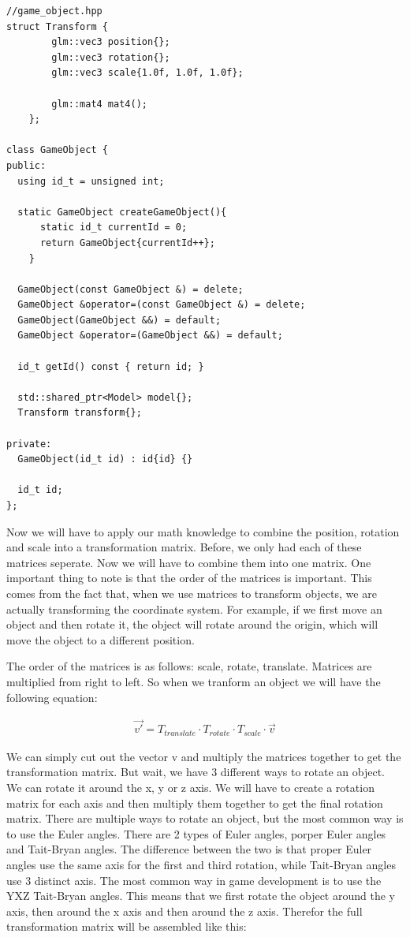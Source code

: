 \documentclass[12pt]{report} \usepackage{preamble}
\begin{document}
\begin{lstlisting}[Language=C++]
//game_object.hpp
struct Transform {
		glm::vec3 position{};
		glm::vec3 rotation{};
		glm::vec3 scale{1.0f, 1.0f, 1.0f};

		glm::mat4 mat4();
	};

class GameObject {
public:
  using id_t = unsigned int;

  static GameObject createGameObject(){
      static id_t currentId = 0;
      return GameObject{currentId++};
    }

  GameObject(const GameObject &) = delete;
  GameObject &operator=(const GameObject &) = delete;
  GameObject(GameObject &&) = default;
  GameObject &operator=(GameObject &&) = default;

  id_t getId() const { return id; }

  std::shared_ptr<Model> model{};
  Transform transform{};

private:
  GameObject(id_t id) : id{id} {}

  id_t id;
};
\end{lstlisting}

Now we will have to apply our math knowledge to combine the position, rotation and scale into a transformation matrix.
Before, we only had each of these matrices seperate. Now we will have to combine them into one matrix.
One important thing to note is that the order of the matrices is important. This comes from the fact that, when we use matrices to transform objects,
we are actually transforming the coordinate system. For example, if we first move an object and then rotate it, the object will rotate around the origin,
which will move the object to a different position.

The order of the matrices is as follows: scale, rotate, translate. Matrices are multiplied from right to left. So when we tranform an object we will have the following equation:

\begin{equation}
	\begin{aligned}
		\vec{v'} = T_{translate} \cdot T_{rotate} \cdot T_{scale} \cdot \vec{v}
	\end{aligned}
\end{equation}

We can simply cut out the vector v and multiply the matrices together to get the transformation matrix. But wait, we have 3 different ways to rotate an object.
We can rotate it around the x, y or z axis. We will have to create a rotation matrix for each axis and then multiply them together to get the final rotation matrix.
There are multiple ways to rotate an object, but the most common way is to use the Euler angles. There are 2 types of Euler angles, porper Euler angles and Tait-Bryan angles.
The difference between the two is that proper Euler angles use the same axis for the first and third rotation, while Tait-Bryan angles use 3 distinct axis.
The most common way in game development is to use the YXZ Tait-Bryan angles. This means that we first rotate the object around the y axis, then around the x axis and then around the z axis.
Therefor the full transformation matrix will be assembled like this:
\end{document}
